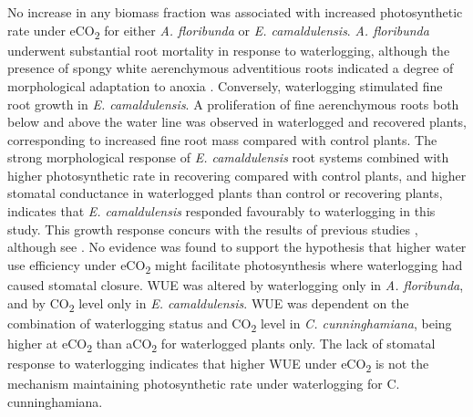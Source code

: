 \documentclass[12pt,a4paper]{memoir}
\begin{document}
No increase in any biomass fraction was associated with increased photosynthetic rate under eCO\textsubscript{2} for either \textit{A. floribunda} or \textit{E. camaldulensis}. \textit{A. floribunda} underwent substantial root mortality in response to waterlogging, although the presence of spongy white aerenchymous adventitious roots indicated a degree of morphological adaptation to anoxia \citep{Evans2004}. Conversely, waterlogging stimulated fine root growth in \textit{E. camaldulensis}. A proliferation of fine aerenchymous roots both below and above the water line was observed in waterlogged and recovered plants, corresponding to increased fine root mass compared with control plants. The strong morphological response of \textit{E. camaldulensis} root systems combined with higher photosynthetic rate in recovering compared with control plants, and higher stomatal conductance in waterlogged plants than control or recovering plants, indicates that \textit{E. camaldulensis} responded favourably to waterlogging in this study. This growth response concurs with the results of previous studies \citep{Sena-Gomes1980, Marcar1993}, although see \citet{Kogawara2006}. No evidence was found to support the hypothesis that higher water use efficiency under eCO\textsubscript{2} might facilitate photosynthesis where waterlogging had caused stomatal closure. WUE was altered by waterlogging only in \textit{A. floribunda}, and by CO\textsubscript{2} level only in \textit{E. camaldulensis}. WUE was dependent on the combination of waterlogging status and CO\textsubscript{2} level in \textit{C. cunninghamiana}, being higher at eCO\textsubscript{2} than aCO\textsubscript{2} for waterlogged plants only. The lack of stomatal response to waterlogging indicates that higher WUE under eCO\textsubscript{2} is not the mechanism maintaining photosynthetic rate under waterlogging for C. cunninghamiana. 
\end{document}
